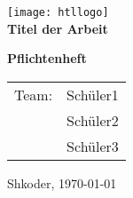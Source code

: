 
\newcommand{\trtitle}{Titel der Arbeit}
\newcommand{\trort}{Shkoder}
\newcommand{\trdate}{\today}
\newcommand{\trclass}{5X}
\newcommand{\trschuelereins}{Sch\"uler1}
\newcommand{\trschuelerzwei}{Sch\"uler2}
\newcommand{\trschuelerdrei}{Sch\"uler3}
\newcommand{\trbetreuereins}{Lehrer1}
\newcommand{\trbetreuerzwei}{Lehrer2}
\newcommand{\trbetreuerdrei}{Lehrer3}

\thispagestyle{empty}

\begin{center}
  \texttt{[image: htllogo]} \\
  \textbf{\LARGE \trtitle}
\end{center}
\vspace{1cm}

\begin{flushleft}
\textbf{\LARGE Pflichtenheft}

\vspace{3cm}
\begin{table}[htbp]
\Large
\begin{tabular}{cc}
   Team: & \trschuelereins \\ 
   & \trschuelerzwei \\ 
   & \trschuelerdrei \\ 
 \end{tabular}
\end{table}
\end{flushleft}

\large \trort{}, \today

\vfill